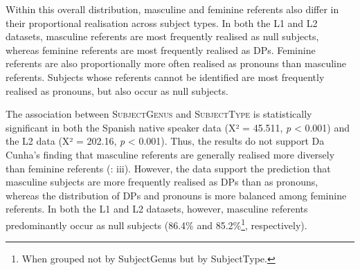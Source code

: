 \documentclass[
  letterpaper,
  DIV=11,
  numbers=noendperiod]{scrartcl}
\begin{document}
Within this overall distribution, masculine and feminine referents also
differ in their proportional realisation across subject types. In both
the L1 and L2 datasets, masculine referents are most frequently realised
as null subjects, whereas feminine referents are most frequently
realised as DPs. Feminine referents are also proportionally more often
realised as pronouns than masculine referents. Subjects whose referents
cannot be identified are most frequently realised as pronouns, but also
occur as null subjects.

The association between \textsc{SubjectGenus} and \textsc{SubjectType}
is statistically significant in both the Spanish native speaker data (X²
= 45.511, \emph{p} \textless{} 0.001) and the L2 data (X² = 202.16,
\emph{p} \textless{} 0.001). Thus, the results do not support Da Cunha's
finding that masculine referents are generally realised more diversely
than feminine referents (: iii).
However, the data support the prediction that masculine subjects are
more frequently realised as DPs than as pronouns, whereas the
distribution of DPs and pronouns is more balanced among feminine
referents. In both the L1 and L2 datasets, however, masculine referents
predominantly occur as null subjects (86.4\% and 85.2\%\footnote{When
  grouped not by SubjectGenus but by SubjectType.}, respectively).
\end{document}

